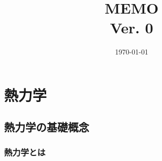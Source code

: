 \documentclass[a4j,10pt,oneside,openany,standalone, dvipdfmx]{jsbook}
\title{{\Huge \textbf{MEMO}}\\ {\small Ver. 0}}
\date{\today}%
\begin{document}
%
%
\maketitle
\frontmatter
\tableofcontents
\clearpage
%
%
\mainmatter

\chapter{熱力学}%
\section{熱力学の基礎概念}
\subsection{熱力学とは}
\end{document}
